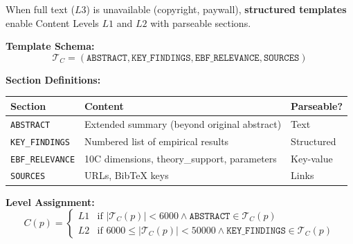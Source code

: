 
\begin{tcolorbox}[colback=blue!5!white, colframe=blue!75!black,
    title=\textbf{Definition 2a: L1/L2 Template Structure $\mathcal{T}_{L1}, \mathcal{T}_{L2}$}]

When full text ($L3$) is unavailable (copyright, paywall), \textbf{structured templates}
enable Content Levels $L1$ and $L2$ with parseable sections.

\textbf{Template Schema:}
\begin{equation}
\mathcal{T}_C = (\texttt{ABSTRACT}, \texttt{KEY\_FINDINGS}, \texttt{EBF\_RELEVANCE}, \texttt{SOURCES})
\end{equation}

\textbf{Section Definitions:}
\begin{table}[H]
\centering
\begin{tabular}{@{}lp{5cm}l@{}}
\toprule
\textbf{Section} & \textbf{Content} & \textbf{Parseable?} \\
\midrule
\texttt{ABSTRACT} & Extended summary (beyond original abstract) & Text \\
\texttt{KEY\_FINDINGS} & Numbered list of empirical results & Structured \\
\texttt{EBF\_RELEVANCE} & 10C dimensions, theory\_support, parameters & Key-value \\
\texttt{SOURCES} & URLs, BibTeX keys & Links \\
\bottomrule
\end{tabular}
\end{table}

\textbf{Level Assignment:}
\begin{equation}
C(p) = \begin{cases}
L1 & \text{if } |\mathcal{T}_C(p)| < 6000 \land \texttt{ABSTRACT} \in \mathcal{T}_C(p) \\
L2 & \text{if } 6000 \leq |\mathcal{T}_C(p)| < 50000 \land \texttt{KEY\_FINDINGS} \in \mathcal{T}_C(p)
\end{cases}
\end{equation}

\end{tcolorbox}

